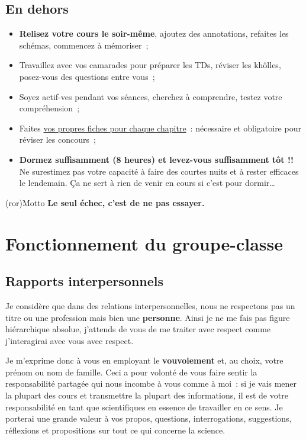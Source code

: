 \documentclass[10pt, garamond]{book}
\begin{document}
\subsection{En dehors}
\begin{itemize}
	\item \textbf{Relisez votre cours le soir-même}, ajoutez des annotations,
	      refaites les schémas, commencez à mémoriser~;
	\item Travaillez avec vos camarades pour préparer les TDs, réviser les
	      khôlles, posez-vous des questions entre vous~;
	\item Soyez actif-ves pendant vos séances, cherchez à comprendre, testez
	      votre compréhension~;
	\item Faites \underline{vos propres fiches pour chaque chapitre}~:
	      nécessaire et obligatoire pour réviser les concours~;
	\item \textbf{Dormez suffisamment (8 heures) et levez-vous suffisamment tôt
		      !!} Ne surestimez pas votre capacité à faire des courtes nuits et à
	      rester efficaces le lendemain. Ça ne sert à rien de venir en cours si
	      c'est pour dormir…
\end{itemize}

\begin{tcb}[cnt](ror){Motto}
	\Large\bfseries
	Le seul échec, c'est de ne pas essayer.
\end{tcb}

\section{Fonctionnement du groupe-classe}
\subsection{Rapports interpersonnels}

Je considère que dans des relations interpersonnelles, nous ne respectons pas un
titre ou une profession mais bien une \textbf{personne}. Ainsi je ne me fais pas
figure hiérarchique absolue, j'attends de vous de me traiter avec respect comme
j'interagirai avec vous avec respect.

Je m'exprime donc à vous en employant le \textbf{vouvoiement} et, au choix,
votre prénom ou nom de famille. Ceci a pour volonté de vous faire sentir la
responsabilité partagée qui nous incombe à vous comme à moi~: si je vais mener
la plupart des cours et transmettre la plupart des informations, il est de votre
responsabilité en tant que scientifiques en essence de travailler en ce sens. Je
porterai une grande valeur à vos propos, questions, interrogations, suggestions,
réflexions et propositions sur tout ce qui concerne la science.
\end{document}
